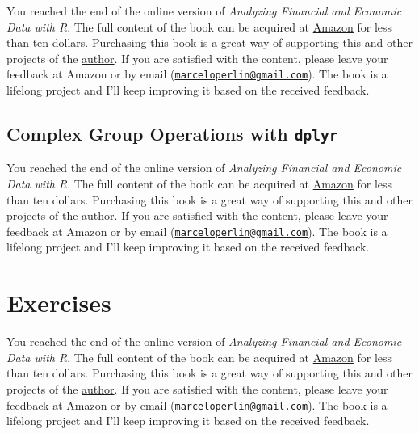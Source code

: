 \documentclass[
  12pt,
]{book}
\newenvironment{pleasebuyit}
{\begin{noteblock}
		
	} {\end{noteblock}}
\begin{document}
\begin{pleasebuyit}
You reached the end of the online version of \emph{Analyzing Financial
and Economic Data with R}. The full content of the book can be acquired
at \href{https://www.amazon.com/dp/B084LSNXMN}{Amazon} for less than ten
dollars. Purchasing this book is a great way of supporting this and
other projects of the \href{https://www.msperlin.com/blog/}{author}. If
you are satisfied with the content, please leave your feedback at Amazon
or by email
(\href{mailto:marceloperlin@gmail.com}{\nolinkurl{marceloperlin@gmail.com}}).
The book is a lifelong project and I'll keep improving it based on the
received feedback.
\end{pleasebuyit}

\hypertarget{complex-group-operations-with-dplyr}{%
\subsection{\texorpdfstring{Complex Group Operations with \texttt{dplyr}}{Complex Group Operations with dplyr}}\label{complex-group-operations-with-dplyr}}

\begin{pleasebuyit}
You reached the end of the online version of \emph{Analyzing Financial
and Economic Data with R}. The full content of the book can be acquired
at \href{https://www.amazon.com/dp/B084LSNXMN}{Amazon} for less than ten
dollars. Purchasing this book is a great way of supporting this and
other projects of the \href{https://www.msperlin.com/blog/}{author}. If
you are satisfied with the content, please leave your feedback at Amazon
or by email
(\href{mailto:marceloperlin@gmail.com}{\nolinkurl{marceloperlin@gmail.com}}).
The book is a lifelong project and I'll keep improving it based on the
received feedback.
\end{pleasebuyit}

\hypertarget{exercises-5}{%
\section{Exercises}\label{exercises-5}}

\begin{pleasebuyit}
You reached the end of the online version of \emph{Analyzing Financial
and Economic Data with R}. The full content of the book can be acquired
at \href{https://www.amazon.com/dp/B084LSNXMN}{Amazon} for less than ten
dollars. Purchasing this book is a great way of supporting this and
other projects of the \href{https://www.msperlin.com/blog/}{author}. If
you are satisfied with the content, please leave your feedback at Amazon
or by email
(\href{mailto:marceloperlin@gmail.com}{\nolinkurl{marceloperlin@gmail.com}}).
The book is a lifelong project and I'll keep improving it based on the
received feedback.
\end{pleasebuyit}
\end{document}
